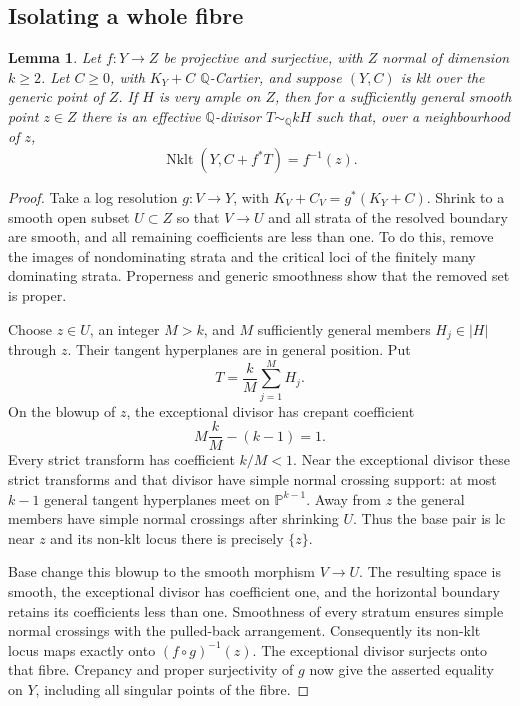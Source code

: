 \documentclass[11pt,reqno]{amsart}
\numberwithin{equation}{section}
\newtheorem{lemma}[theorem]{Lemma}
\theoremstyle{definition}
\theoremstyle{remark}
\newcommand{\Q}{\mathbb Q}
\newcommand{\PP}{\mathbb P}
\newcommand{\simq}{\sim_{\Q}}
\newcommand{\Nklt}{\operatorname{Nklt}}
\begin{document}
\subsection{Isolating a whole fibre}
\begin{lemma}\label{lem:isolate}
Let $f:Y\to Z$ be projective and surjective, with $Z$ normal of dimension $k\ge2$. Let $C\ge0$, with $K_Y+C$ $\Q$-Cartier, and suppose $(Y,C)$ is klt over the generic point of $Z$. If $H$ is very ample on $Z$, then for a sufficiently general smooth point $z\in Z$ there is an effective $\Q$-divisor $T\simq kH$ such that, over a neighbourhood of $z$,
\[
 \Nklt(Y,C+f^*T)=f^{-1}(z).
\]
\end{lemma}
\begin{proof}
Take a log resolution $g:V\to Y$, with $K_V+C_V=g^*(K_Y+C)$. Shrink to a smooth open subset $U\subset Z$ so that $V\to U$ and all strata of the resolved boundary are smooth, and all remaining coefficients are less than one. To do this, remove the images of nondominating strata and the critical loci of the finitely many dominating strata. Properness and generic smoothness show that the removed set is proper.

Choose $z\in U$, an integer $M>k$, and $M$ sufficiently general members $H_j\in|H|$ through $z$. Their tangent hyperplanes are in general position. Put
\[
 T=\frac{k}{M}\sum_{j=1}^M H_j.
\]
On the blowup of $z$, the exceptional divisor has crepant coefficient
\[
 M\frac{k}{M}-(k-1)=1.
\]
Every strict transform has coefficient $k/M<1$. Near the exceptional divisor these strict transforms and that divisor have simple normal crossing support: at most $k-1$ general tangent hyperplanes meet on $\PP^{k-1}$. Away from $z$ the general members have simple normal crossings after shrinking $U$. Thus the base pair is lc near $z$ and its non-klt locus there is precisely $\{z\}$.

Base change this blowup to the smooth morphism $V\to U$. The resulting space is smooth, the exceptional divisor has coefficient one, and the horizontal boundary retains its coefficients less than one. Smoothness of every stratum ensures simple normal crossings with the pulled-back arrangement. Consequently its non-klt locus maps exactly onto $(f\circ g)^{-1}(z)$. The exceptional divisor surjects onto that fibre. Crepancy and proper surjectivity of $g$ now give the asserted equality on $Y$, including all singular points of the fibre.
\end{proof}
\end{document}
